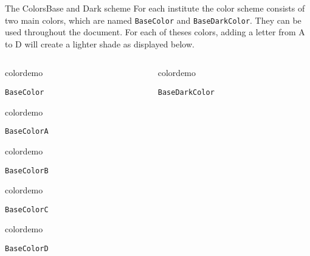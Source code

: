 \begin{frame}{The Colors}{Base and Dark scheme}
For each institute the color scheme consists of two main colors, which are named 
\texttt{BaseColor} and \texttt{BaseDarkColor}. They can be used throughout the document. For each of theses colors, adding a letter from A to D will create a lighter shade as displayed below.
%
%
%
%
%
\vspace{1em}%
\begin{columns}
\begin{column}{0.5\textwidth}
\begin{beamercolorbox}[dp=0pt,sep=0em,wd=15cm,ht=10cm]{}
%
\begin{beamercolorbox}[sep=0em,wd=2cm,ht=2cm]{colordemo}%
\end{beamercolorbox}\quad\texttt{BaseColor}\newline%
%
\begin{beamercolorbox}[sep=0em,wd=2cm,ht=2cm]{colordemo}
\end{beamercolorbox}\quad\texttt{BaseColorA}\hfill\newline%
%
\begin{beamercolorbox}[sep=0em,wd=2cm,ht=2cm]{colordemo}%
\end{beamercolorbox}\quad\texttt{BaseColorB}\hfill\newline%
%
\begin{beamercolorbox}[sep=0em,wd=2cm,ht=2cm]{colordemo}%
\end{beamercolorbox}\quad\texttt{BaseColorC}\hfill\newline%
%
\begin{beamercolorbox}[sep=0em,wd=2cm,ht=2cm]{colordemo}%
\end{beamercolorbox}\quad\texttt{BaseColorD}%
\end{beamercolorbox}%
\end{column}
%
% 
%
\begin{column}{0.5\textwidth}
\begin{beamercolorbox}[dp=0pt,sep=0em,wd=15cm,ht=10cm]{}
%
\begin{beamercolorbox}[sep=0em,wd=2cm,ht=2cm]{colordemo}%
\end{beamercolorbox}\quad\texttt{BaseDarkColor}\newline%
%

\end{beamercolorbox}
\end{column}
\end{columns}
\end{frame}
